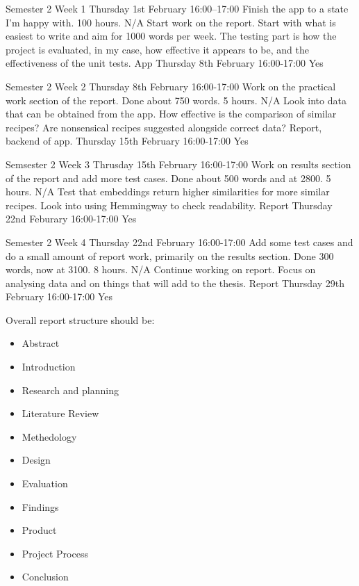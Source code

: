 \documentclass[../CHEFCookingHelper.tex]{subfiles}
\begin{document}
\logbookentry
{Semester 2 Week 1}
{Thursday 1st February 16:00--17:00}
{Finish the app to a state I'm happy with.}
{100 hours.}
{N/A}
{Start work on the report. Start with what is easiest to write and aim for 1000 words
per week. The testing part is how the project is evaluated, in my case, how effective
it appears to be, and the effectiveness of the unit tests.}
{App}
{Thursday 8th February 16:00-17:00}
{Yes}

\logbookentry
{Semester 2 Week 2}
{Thursday 8th February 16:00-17:00}
{Work on the practical work section of the report. Done about 750 words.}
{5 hours.}
{N/A}
{Look into data that can be obtained from the app. How effective is the
comparison of similar recipes? Are nonsensical recipes suggested alongside
correct data?}
{Report, backend of app.}
{Thursday 15th February 16:00-17:00}
{Yes}

\logbookentry
{Semsester 2 Week 3}
{Thrusday 15th February 16:00-17:00}
{Work on results section of the report and add more test cases. Done about 500 words and at 2800.}
{5 hours.}
{N/A}
{Test that embeddings return higher similarities for more similar recipes.
Look into using Hemmingway to check readability.}
{Report}
{Thursday 22nd Feburary  16:00-17:00}
{Yes}

\logbookentry
{Semester 2 Week 4}
{Thursday 22nd February 16:00-17:00}
{Add some test cases and do a small amount of report work, primarily on the results
section. Done 300 words, now at 3100.}
{8 hours.}
{N/A}
{Continue working on report. Focus on analysing data and on things that will add to the thesis.}
{Report}
{Thursday 29th February 16:00-17:00}
{Yes}

Overall report structure should be:
\begin{itemize}
    \item Abstract
    \item Introduction
    \item Research and planning
    \item Literature Review
    \item Methedology
    \item Design
    \item Evaluation
    \item Findings
    \item Product
    \item Project Process
    \item Conclusion
\end{itemize}
\end{document}
